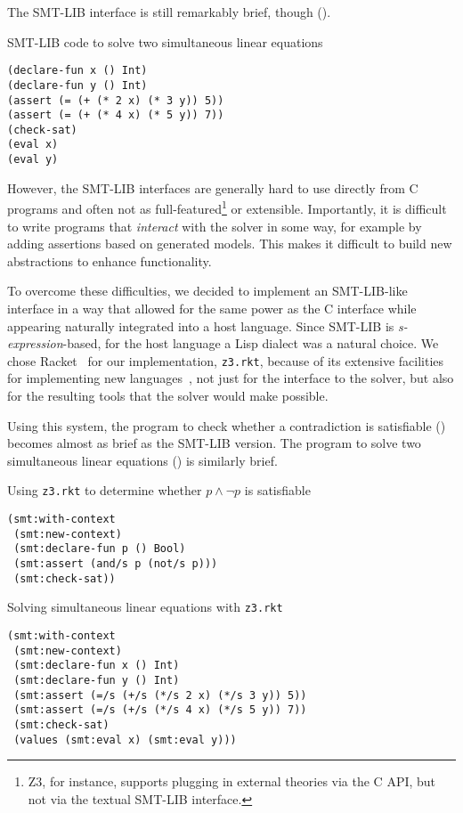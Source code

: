The SMT-LIB interface is still remarkably brief, though ().

\begin{program}
\caption{SMT-LIB code to solve two simultaneous linear equations}
\label{fig:smtlib-simultaneous}
\begin{verbatim}
(declare-fun x () Int)
(declare-fun y () Int)
(assert (= (+ (* 2 x) (* 3 y)) 5))
(assert (= (+ (* 4 x) (* 5 y)) 7))
(check-sat)
(eval x)
(eval y)
\end{verbatim}
\end{program}

However, the SMT-LIB interfaces are generally hard to use directly from C
programs and often not as full-featured\footnote{Z3, for instance, supports
plugging in external theories via the C API, but not via the textual SMT-LIB
interface.}  or extensible. Importantly, it is difficult to write programs
that \textit{interact} with the solver in some way, for example by adding
assertions based on generated models. This makes it difficult to build new
abstractions to enhance functionality.

To overcome these difficulties, we decided to implement an SMT-LIB-like
interface in a way that allowed for the same power as the C interface while
appearing naturally integrated into a host language. Since SMT-LIB is {\em
s-expression}-based, for the host language a Lisp dialect was a natural
choice. We chose Racket~\cite{racket} for our implementation, \texttt{z3.rkt},
because of its extensive facilities for implementing new languages~\cite
{Tobin-Hochstadt:11}, not just for the interface to the solver, but also for
the resulting tools that the solver would make possible.

Using this system, the program to check whether a contradiction is satisfiable
() becomes almost as brief as the SMT-LIB version. The
program to solve two simultaneous linear equations () is
similarly brief.

\begin{program}
\caption{Using \texttt{z3.rkt} to determine whether $p \wedge \neg p$ is satisfiable}
\label{fig:rkt-prop}
\begin{verbatim}
(smt:with-context
 (smt:new-context)
 (smt:declare-fun p () Bool)
 (smt:assert (and/s p (not/s p)))
 (smt:check-sat))
\end{verbatim}
\end{program}

\begin{program}
\caption{Solving simultaneous linear equations with \texttt{z3.rkt}}
\label{fig:rkt-simultaneous}
\begin{verbatim}
(smt:with-context
 (smt:new-context)
 (smt:declare-fun x () Int)
 (smt:declare-fun y () Int)
 (smt:assert (=/s (+/s (*/s 2 x) (*/s 3 y)) 5))
 (smt:assert (=/s (+/s (*/s 4 x) (*/s 5 y)) 7))
 (smt:check-sat)
 (values (smt:eval x) (smt:eval y)))
\end{verbatim}
\end{program}

